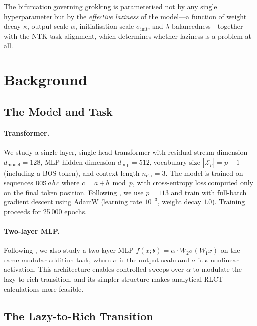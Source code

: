 \documentclass[11pt,a4paper]{article}
\begin{document}
The bifurcation governing grokking is parameterised not by any single hyperparameter but by the \emph{effective laziness} of the model---a function of weight decay $\kappa$, output scale $\alpha$, initialisation scale $\sigma_{\mathrm{init}}$, and $\lambda$-balancedness---together with the NTK-task alignment, which determines whether laziness is a problem at all.

\section{Background}

\subsection{The Model and Task}

\paragraph{Transformer.} We study a single-layer, single-head transformer with residual stream dimension $d_{\mathrm{model}} = 128$, MLP hidden dimension $d_{\mathrm{mlp}} = 512$, vocabulary size $|\mathcal{X}_p| = p + 1$ (including a BOS token), and context length $n_{\mathrm{ctx}} = 3$. The model is trained on sequences $\texttt{BOS}\, a\, b\, c$ where $c = a + b \bmod p$, with cross-entropy loss computed only on the final token position. Following \citet{power2022grokking}, we use $p = 113$ and train with full-batch gradient descent using AdamW (learning rate $10^{-3}$, weight decay $1.0$). Training proceeds for 25,000 epochs.

\paragraph{Two-layer MLP.} Following \citet{kumar2024grokking}, we also study a two-layer MLP $f(x; \theta) = \alpha \cdot W_2 \sigma(W_1 x)$ on the same modular addition task, where $\alpha$ is the output scale and $\sigma$ is a nonlinear activation. This architecture enables controlled sweeps over $\alpha$ to modulate the lazy-to-rich transition, and its simpler structure makes analytical RLCT calculations more feasible.

\subsection{The Lazy-to-Rich Transition}
\end{document}
